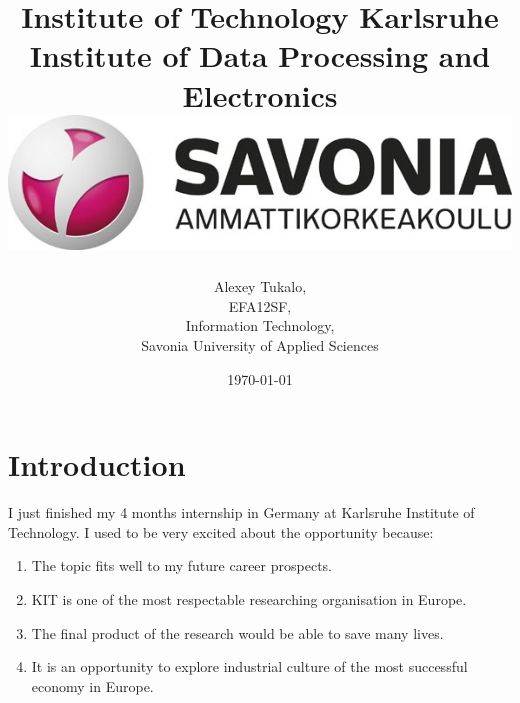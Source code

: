 \documentclass[english]{article}
\date{}
\begin{document}
\title{\vspace{2in}Institute of Technology Karlsruhe\\
\small Institute of Data Processing and Electronics\\
\vspace{0.5in}\includegraphics{savonia.jpg}}

\nopagebreak
\maketitle


\vspace{3in}

\author{
\begin{flushright}
Alexey Tukalo,\\
EFA12SF,\\
Information Technology,\\
Savonia University of Applied Sciences
\end{flushright}
}

\date{\today}
\thispagestyle{empty}

\newpage
\setcounter{page}{1}
\setcounter{tocdepth}{2}
\tableofcontents

\newpage


\section{Introduction}

I just finished my 4 months internship in Germany at Karlsruhe Institute of Technology. I used to be very excited about the opportunity because: 

\begin{enumerate}
\item The topic fits well to my future career prospects.
\item KIT is one of the most respectable researching organisation in Europe.
\item The final product of the research would be able to save many lives.
\item It is an opportunity to explore industrial culture of the most successful economy in Europe.
\end{enumerate}
\end{document}
